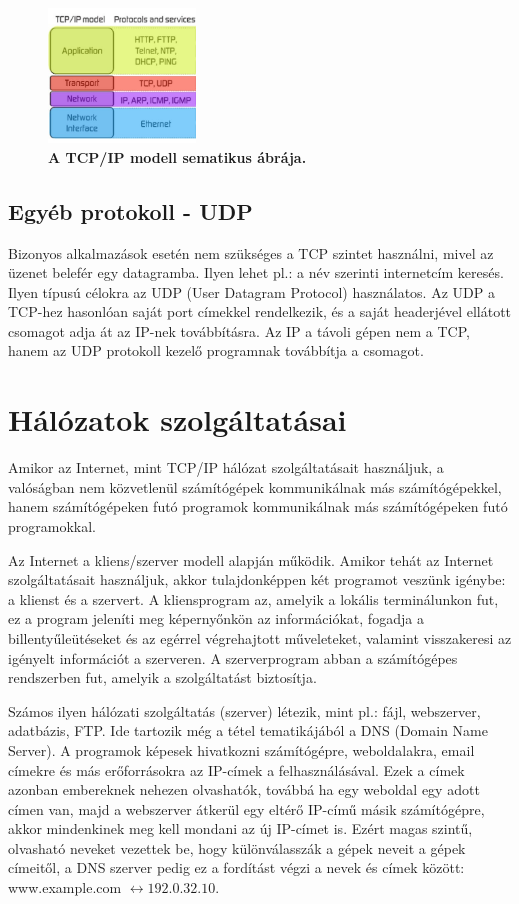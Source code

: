 \documentclass[12pt]{article}
\theoremstyle{plain}
\begin{document}
\begin{figure}[H]
    \begin{center}
    \includegraphics[width=0.35\textwidth]{media/tcpip.jpeg}
    \caption{\textbf{A TCP/IP modell sematikus ábrája.}} 
    \label{fig:tcpip}
    \end{center}
\end{figure}


\subsection {Egyéb protokoll - UDP}
Bizonyos alkalmazások esetén nem szükséges a TCP szintet használni, mivel az üzenet belefér egy datagramba. Ilyen lehet pl.: a név szerinti internetcím keresés. Ilyen típusú célokra az UDP (User Datagram Protocol) használatos. Az UDP a TCP-hez hasonlóan saját port címekkel rendelkezik, és a saját headerjével ellátott csomagot adja át az IP-nek továbbításra. Az IP a távoli gépen nem a TCP, hanem az UDP protokoll kezelő programnak továbbítja a csomagot.

\section{Hálózatok szolgáltatásai}

Amikor az Internet, mint TCP/IP hálózat szolgáltatásait használjuk, a valóságban nem közvetlenül számítógépek kommunikálnak más számítógépekkel, hanem számítógépeken futó programok kommunikálnak más számítógépeken futó programokkal. 
\par
Az Internet a kliens/szerver modell alapján működik. Amikor tehát az Internet szolgáltatásait használjuk, akkor tulajdonképpen két programot veszünk igénybe: a klienst és a szervert. A kliensprogram az, amelyik a lokális terminálunkon fut, ez a program jeleníti meg képernyőnkön az információkat, fogadja a billentyűleütéseket és az egérrel végrehajtott műveleteket, valamint visszakeresi az igényelt információt a szerveren. A szerverprogram abban a számítógépes rendszerben fut, amelyik a szolgáltatást biztosítja.
\par
Számos ilyen hálózati szolgáltatás (szerver) létezik, mint pl.: fájl, webszerver, adatbázis, FTP. Ide tartozik még a tétel tematikájából a
 DNS (Domain Name Server). A programok képesek hivatkozni számítógépre, weboldalakra, email címekre és más erőforrásokra az IP-címek a felhasználásával. Ezek a címek azonban embereknek nehezen olvashatók, továbbá ha egy weboldal egy adott címen van, majd a webszerver átkerül egy eltérő IP-című másik számítógépre, akkor mindenkinek meg kell mondani az új IP-címet is. Ezért magas szintű, olvasható neveket vezettek be, hogy különválasszák a gépek neveit a gépek címeitől, a DNS szerver pedig ez a fordítást végzi a nevek és címek között: www.example.com $\leftrightarrow 192.0.32.10$.
\end{document}
